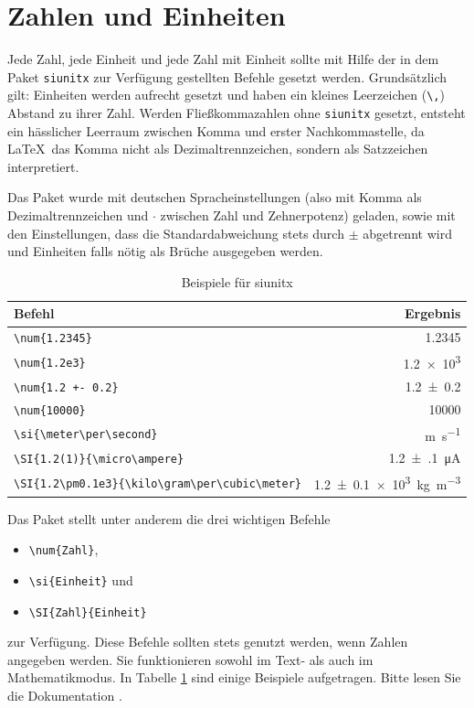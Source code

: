 \section{Zahlen und Einheiten}

Jede Zahl, jede Einheit und jede Zahl mit Einheit sollte mit Hilfe der in dem Paket \texttt{siunitx} zur Verfügung gestellten Befehle gesetzt werden.
Grundsätzlich gilt: Einheiten werden aufrecht gesetzt und haben ein kleines Leerzeichen (\verb+\,+) Abstand zu ihrer Zahl. 
Werden Fließkommazahlen ohne \texttt{siunitx} gesetzt, entsteht ein hässlicher Leerraum zwischen Komma und erster Nachkommastelle, da \LaTeX \ das Komma nicht als Dezimaltrennzeichen, sondern als Satzzeichen interpretiert.

Das Paket wurde mit deutschen Spracheinstellungen (also mit Komma als Dezimaltrennzeichen und $\cdot$ zwischen Zahl und Zehnerpotenz) geladen, sowie mit den Einstellungen, dass die Standardabweichung stets durch $\pm$ abgetrennt wird und Einheiten falls nötig als Brüche ausgegeben werden.

\begin{table}
    \centering
    \caption{Beispiele für siunitx}
    \label{tab:si}
    \begin{tabular}{l r}
        \toprule
        Befehl     &   Ergebnis \\
        \midrule
        \verb+\num{1.2345}+ & \num{1.2345} \\
        \verb+\num{1.2e3}+ & \num{1.2e3} \\
        \verb_\num{1.2 +- 0.2}_ & \num{1.2+-0.2} \\
        \verb+\num{10000}+ & \num{10000} \\
        \verb+\si{\meter\per\second}+ & \si{\meter\per\second} \\
        \verb+\SI{1.2(1)}{\micro\ampere}+ & \SI{1.2(1)}{\micro\ampere} \\
        \verb+\SI{1.2\pm0.1e3}{\kilo\gram\per\cubic\meter}+ & \SI{1.2\pm0.1e3}{\kilo\gram\per\cubic\meter} \\
        \bottomrule 
    \end{tabular}
\end{table}

Das Paket stellt unter anderem die drei wichtigen Befehle
\begin{itemize}
    \item \texttt{\textbackslash num\{Zahl\}},
    \item \texttt{\textbackslash si\{Einheit\}} und
    \item \texttt{\textbackslash SI\{Zahl\}\{Einheit\}}
\end{itemize}
zur Verfügung.
Diese Befehle sollten stets genutzt werden, wenn Zahlen angegeben werden. 
Sie funktionieren sowohl im Text- als auch im Mathematikmodus.
In Tabelle \ref{tab:si} sind einige Beispiele aufgetragen. Bitte lesen Sie die Dokumentation \cite{siunitx}.

